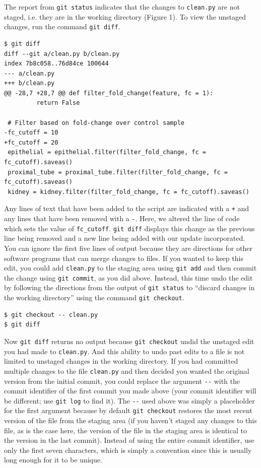 \documentclass[10pt]{article}
\begin{document}
The report from \verb|git status| indicates that the changes to \verb|clean.py| are not staged, i.e. they are in the working directory (Figure 1).
To view the unstaged changes, run the command \verb|git diff|.

\begin{verbatim}
$ git diff
diff --git a/clean.py b/clean.py
index 7b8c058..76d84ce 100644
--- a/clean.py
+++ b/clean.py
@@ -28,7 +28,7 @@ def filter_fold_change(feature, fc = 1):
         return False

 # Filter based on fold-change over control sample
-fc_cutoff = 10
+fc_cutoff = 20
 epithelial = epithelial.filter(filter_fold_change, fc = fc_cutoff).saveas()
 proximal_tube = proximal_tube.filter(filter_fold_change, fc = fc_cutoff).saveas()
 kidney = kidney.filter(filter_fold_change, fc = fc_cutoff).saveas()
\end{verbatim}

Any lines of text that have been added to the script are indicated with a \verb|+| and any lines that have been removed with a \verb|-|.
Here, we altered the line of code which sets the value of \verb|fc_cutoff|.
\verb|git diff| displays this change as the previous line being removed and a new line being added with our update incorporated.
You can ignore the first five lines of output because they are directions for other software programs that can merge changes to files.
If you wanted to keep this edit, you could add \verb|clean.py| to the staging area using \verb|git add| and then commit the change using \verb|git commit|, as you did above.
Instead, this time undo the edit by following the directions from the output of \verb|git status| to ``discard changes in the working directory'' using the command \verb|git checkout|.

\begin{verbatim}
$ git checkout -- clean.py
$ git diff
\end{verbatim}

Now \verb|git diff| returns no output because \verb|git checkout| undid the unstaged edit you had made to \verb|clean.py|.
And this ability to undo past edits to a file is not limited to unstaged changes in the working directory.
If you had committed multiple changes to the file \verb|clean.py| and then decided you wanted the original version from the initial commit, you could replace the argument \verb|--| with the commit identifier of the first commit you made above (your commit identifier will be different; use \verb|git log| to find it).
The \verb|--| used above was simply a placeholder for the first argument because by default \verb|git checkout| restores the most recent version of the file from the staging area (if you haven't staged any changes to this file, as is the case here, the version of the file in the staging area is identical to the version in the last commit).
Instead of using the entire commit identifier, use only the first seven characters, which is simply a convention since this is usually long enough for it to be unique.
\end{document}

